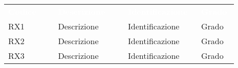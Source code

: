 {\renewcommand{\arraystretch}{1.5}
\begin{tabular}{  >{\centering}p{0.20\linewidth} | >{\centering}p{0.28\linewidth} | >{\centering}p{0.28\linewidth} | >{\centering}p{0.13\linewidth}  }
	\rowcolor[RGB]{33, 73, 50}
	\textcolor{white}{\textbf{Codice}} & \textcolor{white}
	{\textbf{Descrizione}} & \textcolor{white}{\textbf{Identificazione}} & \textcolor{white}{\textbf{Grado}}\tabularnewline
	\rowcolor[RGB]{216, 235, 171}
	RX1 & Descrizione & Identificazione & Grado\tabularnewline
	\rowcolor[RGB]{233, 245, 206}
	RX2 & Descrizione & Identificazione & Grado\tabularnewline
	\rowcolor[RGB]{216, 235, 171}
	RX3 & Descrizione & Identificazione & Grado\tabularnewline
	
\end{tabular}	
}

